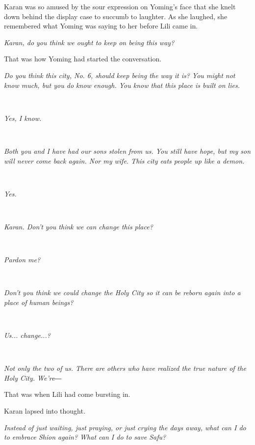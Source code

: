 Karan was so amused by the sour expression on Yoming's face that she
knelt down behind the display case to succumb to laughter. As she
laughed, she remembered what Yoming was saying to her before Lili came
in.

\emph{Karan, do you think we ought to keep on being this way?}

That was how Yoming had started the conversation.

\emph{Do you think this city, No. 6, should keep being the way it is?
You might not know much, but you do know enough. You know that this
place is built on lies.}

\emph{\\
}

\emph{Yes, I know.}

\emph{\\
}

\emph{Both you and I have had our sons stolen from us. You still have
hope, but my son will never come back again. Nor my wife. This city eats
people up like a demon.}

\emph{\\
}

\emph{Yes.}

\emph{\\
}

\emph{Karan. Don't you think we can change this place?}

\emph{\\
}

\emph{Pardon me?}

\emph{\\
}

\emph{Don't you think we could change the Holy City so it can be reborn
again into a place of human beings?}

\emph{\\
}

\emph{Us... change...?}

\emph{\\
}

\emph{Not only the two of us. There are others who have realized the
true nature of the Holy City. We're―}

That was when Lili had come bursting in.

Karan lapsed into thought.

\emph{Instead of just waiting, just praying, or just crying the days
away, what can I do to embrace Shion again? What can I do to save Safu?}

\emph{\\
}

